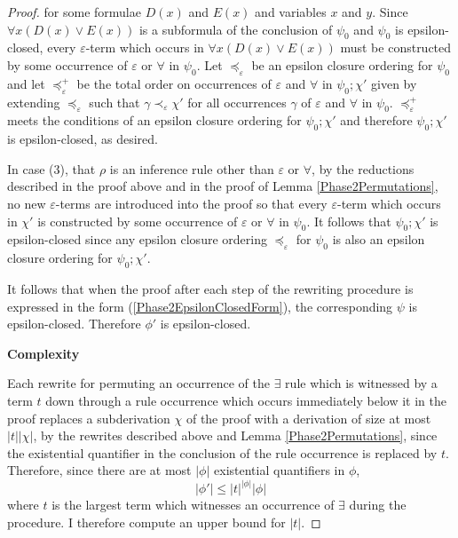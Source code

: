 \documentclass[10pt]{article}
\theoremstyle{definition}\newtheorem{remark}[theorem]{Remark}
\theoremstyle{definition}\newtheorem{example}[theorem]{Example}
\theoremstyle{definition}\newtheorem{definition}[theorem]{Definition}
\newcommand{\falsifierRule}{{\mathsf{\varepsilon}}}
\newcommand{\seqComp}{;}
\begin{document}
\begin{proof}
		for some formulae $D(x)$ and $E(x)$ and variables $x$ and $y$. Since $\forall x (D(x) \lor E(x))$ is a subformula of the conclusion of $\psi_0$ and $\psi_0$ is epsilon-closed, every $\varepsilon$-term which occurs in $\forall x (D(x) \lor E(x))$ must be constructed by some occurrence of $\falsifierRule$ or $\forall$ in $\psi_0$. Let $\preccurlyeq_\varepsilon$ be an epsilon closure ordering for $\psi_0$ and let $\preccurlyeq_\varepsilon^+$ be the total order on occurrences of $\falsifierRule$ and $\forall$ in $\psi_0 \seqComp \chi'$ given by extending $\preccurlyeq_\varepsilon$ such that $\gamma \prec_\varepsilon \chi'$ for all occurrences $\gamma$ of $\falsifierRule$ and $\forall$ in $\psi_0$. $\preccurlyeq_\varepsilon^+$ meets the conditions of an epsilon closure ordering for $\psi_0 \seqComp \chi'$ and therefore $\psi_0 \seqComp \chi'$ is epsilon-closed, as desired.
		
		In case (3), that $\rho$ is an inference rule other than $\falsifierRule$ or $\forall$, by the reductions described in the proof above and in the proof of Lemma \ref{Phase2Permutations}, no new $\varepsilon$-terms are introduced into the proof so that every $\varepsilon$-term which occurs in $\chi'$ is constructed by some occurrence of $\falsifierRule$ or $\forall$ in $\psi_0$. It follows that $\psi_0 \seqComp \chi'$ is epsilon-closed since any epsilon closure ordering $\preccurlyeq_\varepsilon$ for $\psi_0$ is also an epsilon closure ordering for $\psi_0 \seqComp \chi'$.
		
		It follows that when the proof after each step of the rewriting procedure is expressed in the form (\ref{Phase2EpsilonClosedForm}), the corresponding $\psi$ is epsilon-closed. Therefore $\phi'$ is epsilon-closed.
		
		\noindent
		\textbf{Complexity}
		
		Each rewrite for permuting an occurrence of the $\exists$ rule which is witnessed by a term $t$ down through a rule occurrence which occurs immediately below it in the proof replaces a subderivation $\chi$ of the proof with a derivation of size at most $| t | | \chi |$, by the rewrites described above and Lemma \ref{Phase2Permutations}, since the existential quantifier in the conclusion of the rule occurrence is replaced by $t$. Therefore, since there are at most $| \phi |$ existential quantifiers in $\phi$,
		\begin{equation}\label{Psi2Bound}
			| \phi' | \leq | t |^{| \phi |} | \phi |
		\end{equation}
		where $t$ is the largest term which witnesses an occurrence of $\exists$ during the procedure. I therefore compute an upper bound for $| t |$.
		

\end{proof}
\end{document}
